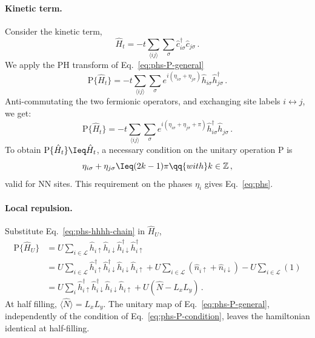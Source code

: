\begin{tabproof}
	\paragraph{Kinetic term.}
	
	Consider the kinetic term,
	\[
		\hat H_t = -t \sum_{\langle ij \rangle} \sum_\sigma \hat c_{i\sigma}^\dagger \hat c_{j\sigma} \, .
	\]
	We apply the PH transform of Eq.~\eqref{eq:phs-P-general}
	\[
		\mathrm{P} \lbrace \hat H_t \rbrace = -t \sum_{\langle ij \rangle} \sum_\sigma e^{i(\eta_{i\sigma} + \eta_{j\sigma})} \hat h_{i\sigma} \hat h_{j\sigma}^\dagger \, .
	\]
	Anti-commutating the two fermionic operators, and exchanging site labels $i \leftrightarrow j$, we get:
	\[
		\mathrm{P} \lbrace \hat H_t \rbrace = -t \sum_{\langle ij \rangle} \sum_\sigma e^{i(\eta_{i\sigma} + \eta_{j\sigma}+\pi)} \hat h_{i\sigma}^\dagger \hat h_{j\sigma} \, .
	\]
	To obtain $\mathrm{P} \lbrace \hat H_t \rbrace \Ieq \hat H_t$, a necessary condition on the unitary operation $\mathrm{P}$ is
	\begin{equation}\label{eq:phs-P-condition}
		\eta_{i\sigma} + \eta_{j\sigma} \Ieq (2k-1)\pi
		\qq{with}
		k\in\mathbb{Z} \, ,
	\end{equation}
	valid for NN sites. This requirement on the phases $\eta_i$ gives Eq.~\eqref{eq:phs}.
	
	\paragraph{Local repulsion.}
	
	Substitute Eq.~\eqref{eq:phs-hhhh-chain} in $\hat H_U$,
	\[
	\begin{aligned}
		\mathrm{P} \lbrace \hat H_U \rbrace &= U \sum_{i\in\mathcal{L}} \hat h_{i\uparrow} \hat h_{i\downarrow} \hat h_{i\downarrow}^\dagger \hat h_{i\uparrow}^\dagger \\
		&= U \sum_{i\in\mathcal{L}} \hat h_{i\uparrow}^\dagger \hat h_{i\downarrow}^\dagger \hat h_{i\downarrow}\hat h_{i\uparrow} + U \sum_{i\in\mathcal{L}} \left(
			\hat n_{i\uparrow} + \hat n_{i\downarrow}
		\right) - U \sum_{i\in\mathcal{L}} (1) \\
		&= U \sum_i \hat h_{i\uparrow}^\dagger \hat h_{i\downarrow}^\dagger \hat h_{i\downarrow}\hat h_{i\uparrow} + U (\hat N - L_x L_y) \, .
	\end{aligned}
	\]
	At half filling, $\langle \hat N \rangle = L_x L_y$. The unitary map of Eq.~\eqref{eq:phs-P-general}, independently of the condition of Eq.~\eqref{eq:phs-P-condition}, leaves the hamiltonian identical at half-filling.
	

\end{tabproof}
